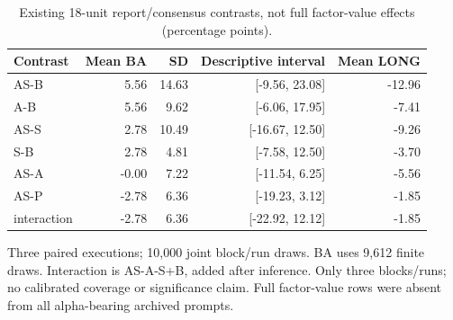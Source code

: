 \begin{table}[htbp]
\centering\small
\caption{Existing 18-unit report/consensus contrasts, not full factor-value effects (percentage points).}
\label{tab:r4_contrasts}
\setlength{\tabcolsep}{3.5pt}
\begin{tabular}{lrrrr}
\hline
Contrast & Mean BA & SD & Descriptive interval & Mean LONG \\
\hline
AS-B & 5.56 & 14.63 & [-9.56, 23.08] & -12.96 \\
A-B & 5.56 & 9.62 & [-6.06, 17.95] & -7.41 \\
AS-S & 2.78 & 10.49 & [-16.67, 12.50] & -9.26 \\
S-B & 2.78 & 4.81 & [-7.58, 12.50] & -3.70 \\
AS-A & -0.00 & 7.22 & [-11.54, 6.25] & -5.56 \\
AS-P & -2.78 & 6.36 & [-19.23, 3.12] & -1.85 \\
interaction & -2.78 & 6.36 & [-22.92, 12.12] & -1.85 \\
\hline
\end{tabular}
\par\smallskip\footnotesize Three paired executions; 10,000 joint block/run draws. BA uses 9,612 finite draws. Interaction is AS-A-S+B, added after inference. Only three blocks/runs; no calibrated coverage or significance claim. Full factor-value rows were absent from all alpha-bearing archived prompts.
\end{table}
